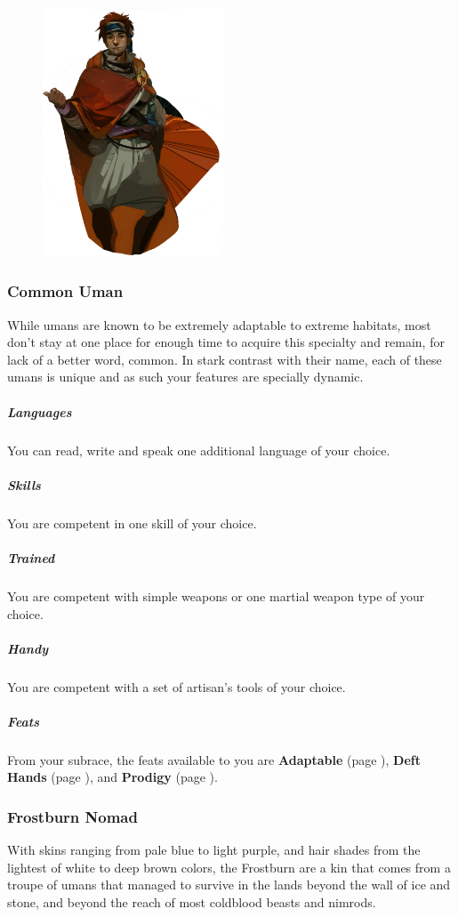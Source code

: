 \begin{figure}[!t]
    \centering
    \includegraphics[width=0.48\textwidth]{04kins/img/19uman_nomad.png}
\end{figure}

\subsubsection{Common Uman}
    While umans are known to be extremely adaptable to extreme habitats, most don't stay at one place for enough time to acquire this specialty and remain, for lack of a better word, common.
    In stark contrast with their name, each of these umans is unique and as such your features are specially dynamic.

    \subparagraph{Languages} You can read, write and speak one additional language of your choice.

    \subparagraph{Skills} You are competent in one skill of your choice.

    \subparagraph{Trained} You are competent with simple weapons or one martial weapon type of your choice.

    \subparagraph{Handy} You are competent with a set of artisan's tools of your choice.

    \subparagraph{Feats} From your subrace, the feats available to you are
    \textbf{Adaptable} (page \pageref{feat::adaptable}),
    \textbf{Deft Hands} (page \pageref{feat::defthands}), and
    \textbf{Prodigy} (page \pageref{feat::prodigy}).

\subsubsection{Frostburn Nomad}
    With skins ranging from pale blue to light purple, and hair shades from the lightest of white to deep brown colors, the Frostburn are a kin that comes from a troupe of umans that managed to survive in the lands beyond the wall of ice and stone, and beyond the reach of most coldblood beasts and nimrods.

